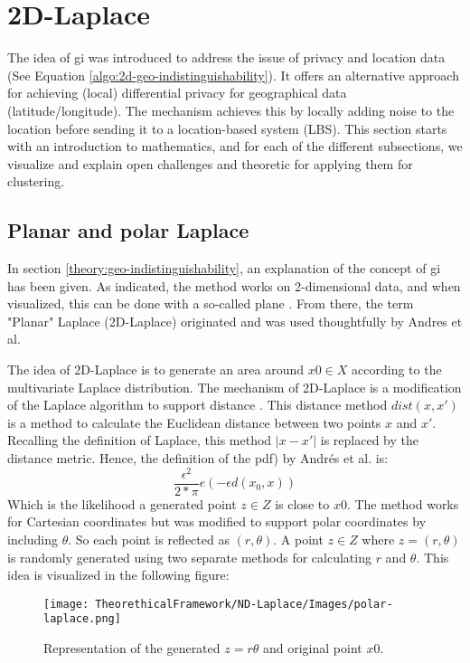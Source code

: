 %
\section{2D-Laplace}
The idea of \gls{gi} was introduced to address the issue of privacy and location data \citep{DBLP:journals/corr/abs-1212-1984} (See Equation \ref{algo:2d-geo-indistinguishability}).
It offers an alternative approach for achieving (local) differential privacy for geographical data (latitude/longitude).
The mechanism achieves this by locally adding noise to the location before sending it to a location-based system (LBS).
This section starts with an introduction to mathematics, and for each of the different subsections, we visualize and explain open challenges and theoretic for applying them for clustering.
\subsection{Planar and polar Laplace}
In section \ref{theory:geo-indistinguishability}, an explanation of the concept of \gls{gi} has been given.
As indicated, the method works on 2-dimensional data, and when visualized, this can be done with a so-called plane \citep{DBLP:journals/corr/abs-1212-1984}.
From there, the term "Planar" Laplace (2D-Laplace) originated and was used thoughtfully by Andres et al.

The idea of 2D-Laplace is to generate an area around $x0 \in X$ according to the multivariate Laplace distribution.
The mechanism of 2D-Laplace is a modification of the Laplace algorithm to support distance \citep{DBLP:journals/corr/abs-1212-1984}.
This distance method $dist(x, x')$ is a method to calculate the Euclidean distance between two points $x$ and $x'$.
Recalling the definition of Laplace, this method $|x-x'|$ is replaced by the distance metric.
Hence, the definition of the \gls{pdf}) by Andrés et al. is:
\begin{equation}
  \frac{\epsilon^2}{2*\pi}e(-\epsilon d(x_0, x))
  \label{eq:polar-laplace-pdf}
\end{equation}
Which is the likelihood a generated point $z \in Z$ is close to $x0$.
The method works for Cartesian coordinates but was modified to support polar coordinates by including $\theta$.
So each point is reflected as $(r, \theta)$.
A point $z \in Z$ where $z = (r, \theta)$ is randomly generated using two separate methods for calculating $r$ and $\theta$.
This idea is visualized in the following figure:
\begin{figure}[H]
  \texttt{[image: TheorethicalFramework/ND-Laplace/Images/polar-laplace.png]}
  \centering
  \caption{Representation of the generated $z = {r \theta}$ and original point $x0$.}
  \label{figure:parea}
\end{figure}


